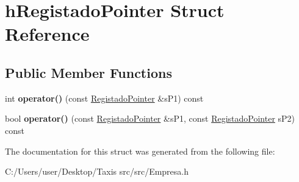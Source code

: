 \hypertarget{structh_registado_pointer}{}\section{h\+Registado\+Pointer Struct Reference}
\label{structh_registado_pointer}
\subsection*{Public Member Functions}
\begin{DoxyCompactItemize}
\item 
\mbox{\label{structh_registado_pointer_af0c9071e78b371e946eecd2c3b8494b8}} 
int {\bfseries operator()} (const \hyperlink{class_registado_pointer}{Registado\+Pointer} \&s\+P1) const
\item 
\mbox{\label{structh_registado_pointer_a9c134e573de8100333645d43351061e3}} 
bool {\bfseries operator()} (const \hyperlink{class_registado_pointer}{Registado\+Pointer} \&s\+P1, const \hyperlink{class_registado_pointer}{Registado\+Pointer} s\+P2) const
\end{DoxyCompactItemize}


The documentation for this struct was generated from the following file\+:\begin{DoxyCompactItemize}
\item 
C\+:/\+Users/user/\+Desktop/\+Taxis src/src/Empresa.\+h\end{DoxyCompactItemize}
